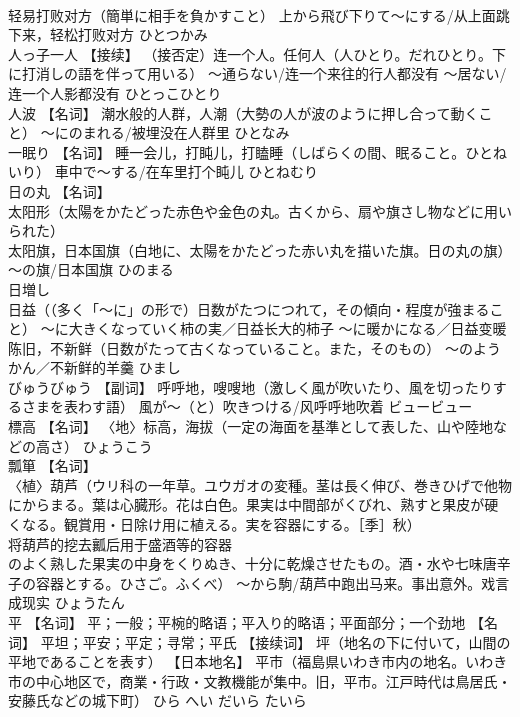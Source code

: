\documentclass[8pt]{extreport}
\begin{document}
\begin{CJK}{UTF8}{min}
\\	轻易打败对方（簡単に相手を負かすこと） 上から飛び下りて～にする/从上面跳下来，轻松打败对方	ひとつかみ	
\\	人っ子一人	【接续】 （接否定）连一个人。任何人（人ひとり。だれひとり。下に打消しの語を伴って用いる） ～通らない/连一个来往的行人都没有 ～居ない/连一个人影都没有	ひとっこひとり	
\\	人波	【名词】 潮水般的人群，人潮（大勢の人が波のように押し合って動くこと） ～にのまれる/被埋没在人群里	ひとなみ	
\\	一眠り	【名词】 睡一会儿，打盹儿，打瞌睡（しばらくの間、眠ること。ひとねいり） 車中で～する/在车里打个盹儿	ひとねむり	
\\	日の丸	【名词】 
\\	太阳形（太陽をかたどった赤色や金色の丸。古くから、扇や旗さし物などに用いられた） 
\\	太阳旗，日本国旗（白地に、太陽をかたどった赤い丸を描いた旗。日の丸の旗） ～の旗/日本国旗	ひのまる	
\\	日増し	
\\	日益（（多く「～に」の形で）日数がたつにつれて，その傾向・程度が強まること） ～に大きくなっていく柿の実／日益长大的柿子 ～に暖かになる／日益变暖 
\\	陈旧，不新鲜（日数がたって古くなっていること。また，そのもの） ～のようかん／不新鲜的羊羹	ひまし	
\\	びゅうびゅう	【副词】 呼呼地，嗖嗖地（激しく風が吹いたり、風を切ったりするさまを表わす語） 風が～（と）吹きつける/风呼呼地吹着	ビュービュー	
\\	標高	【名词】 〈地〉标高，海拔（一定の海面を基準として表した、山や陸地などの高さ）	ひょうこう	
\\	瓢箪	【名词】 
\\	〈植〉葫芦（ウリ科の一年草。ユウガオの変種。茎は長く伸び、巻きひげで他物にからまる。葉は心臓形。花は白色。果実は中間部がくびれ、熟すと果皮が硬くなる。観賞用・日除け用に植える。実を容器にする。［季］秋） 
\\	将葫芦的挖去瓤后用于盛酒等的容器
\\	のよく熟した果実の中身をくりぬき、十分に乾燥させたもの。酒・水や七味唐辛子の容器とする。ひさご。ふくべ） ～から駒/葫芦中跑出马来。事出意外。戏言成现实	ひょうたん	
\\	平	【名词】 平；一般；平椀的略语；平入り的略语；平面部分；一个劲地 【名词】 平坦；平安；平定；寻常；平氏 【接续词】 坪（地名の下に付いて，山間の平地であることを表す） 【日本地名】 平市（福島県いわき市内の地名。いわき市の中心地区で，商業・行政・文教機能が集中。旧，平市。江戸時代は鳥居氏・安藤氏などの城下町）	ひら へい だいら たいら	

\end{CJK}
\end{document}
